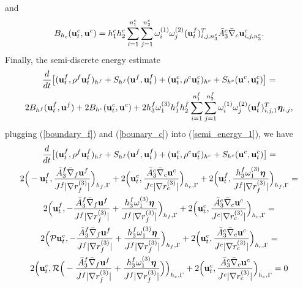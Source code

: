 \documentclass[a4paper]{article}
\begin{document}
and 
\begin{equation}\label{bounary_c}
B_{h_c} ({\bf u}_t^c,{\bf u}^c) = h_1^ch_2^c\sum_{i = 1}^{ n_1^c}\sum_{j=1}^{n_2^c}\omega_i^{(1)}\omega_j^{(2)}({\bf u}_t^f)^T_{i,j,n_3^c}\bar{A}_3^c\bar{\nabla}_c{\bf u}^c_{i,j,n_3^c}.
\end{equation}
Finally, the semi-discrete energy estimate
\begin{multline}\label{semi_energy_1}
\frac{d}{dt}\big[({\bf u}_t^f,\rho^f {\bf u}_t^f)_{h^f} + S_{h^f}({\bf u}^f,{\bf u}^f_t) + ({\bf u}_t^c,\rho^c {\bf u}_t^c)_{h^c} + S_{h^c}({\bf u}^c,{\bf u}^c_t) \big]  = \\
2B_{h^f}({\bf u}_t^f,{\bf u}^f) + 2B_{h^c}({\bf u}_t^c,{\bf u}^c) + 2h_3^f\omega_1^{(3)}h_1^f h_2^f\sum_{i=1}^{n_1^f}\sum_{j=1}^{n_2^f}\omega_i^{(1)}\omega_j^{(2)}({\bf u}_t^f)^T_{i,j,1}{\bm \eta}_{i,j},
\end{multline}
plugging (\ref{boundary_f}) and (\ref{bounary_c}) into (\ref{semi_energy_1}), we have
\begin{multline}\label{semi_energy_2}
\frac{d}{dt}\big[({\bf u}_t^f,\rho^f {\bf u}_t^f)_{h^f} + S_{h^f}({\bf u}^f,{\bf u}^f_t) + ({\bf u}_t^c,\rho^c {\bf u}_t^c)_{h^c} + S_{h^c}({\bf u}^c,{\bf u}^c_t) \big]  = \\
2\Big(-{\bf u}_t^f,\frac{\bar{A}_3^f\bar{\nabla}_f{\bf u}^f}{J^f|\nabla r_f^{(3)}|}\Big)_{h_f,\Gamma} + 2\Big({\bf u}_t^c,\frac{\bar{A}_3^c\bar{\nabla}_c{\bf u}^c}{J^c|\nabla r_c^{(3)}|}\Big)_{h_c,\Gamma} + 2\Big({\bf u}_t^f,\frac{h_3^f\omega_1^{(3)}{\bm \eta}}{J^f|\nabla r_f^{(3)}|}\Big)_{h_f,\Gamma} = \\
2\Big({\bf u}_t^f,-\frac{\bar{A}_3^f\bar{\nabla}_f{\bf u}^f}{J^f|\nabla r_f^{(3)}|} + \frac{h_3^f\omega_1^{(3)}{\bm \eta}}{J^f|\nabla r_f^{(3)}|}\Big)_{h_f,\Gamma} +  2\Big({\bf u}_t^c,\frac{\bar{A}_3^c\bar{\nabla}_c{\bf u}^c}{J^c|\nabla r_c^{(3)}|}\Big)_{h_c,\Gamma} = \\
2\Big(\mathcal{P}{\bf u}^c_t,-\frac{\bar{A}_3^f\bar{\nabla}_f{\bf u}^f}{J^f|\nabla r_f^{(3)}|} + \frac{h_3^f\omega_1^{(3)}{\bm \eta}}{J^f|\nabla r_f^{(3)}|}\Big)_{h_f,\Gamma} + 2\Big({\bf u}_t^c,\frac{\bar{A}_3^c\bar{\nabla}_c{\bf u}^c}{J^c|\nabla r_c^{(3)}|}\Big)_{h_c,\Gamma} = \\
2\Big({\bf u}_t^c,\mathcal{R}\Big(-\frac{\bar{A}_3^f\bar{\nabla}_f{\bf u}^f}{J^f|\nabla r_f^{(3)}|} + \frac{h_3^f\omega_1^{(3)}{\bm \eta}}{J^f|\nabla r_f^{(3)}|}\Big)\Big)_{h_c,\Gamma} + 2\Big({\bf u}_t^c,\frac{\bar{A}_3^c\bar{\nabla}_c{\bf u}^c}{J^c|\nabla r_c^{(3)}|}\Big)_{h_c,\Gamma} = 0
\end{multline}
\end{document}
